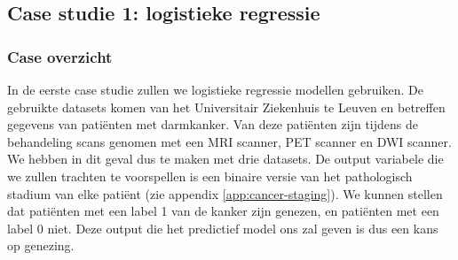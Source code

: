 \begin{abstract*}
\subsection{Case studie 1: logistieke regressie}
\subsubsection{Case overzicht}
In de eerste case studie zullen we logistieke regressie modellen gebruiken. De gebruikte datasets komen van het Universitair Ziekenhuis te Leuven en betreffen gegevens van pati\"enten met darmkanker. Van deze pati\"enten zijn tijdens de behandeling scans genomen met een MRI scanner, PET scanner en DWI scanner. We hebben in dit geval dus te maken met drie datasets. De output variabele die we zullen trachten te voorspellen is een binaire versie van het pathologisch stadium van elke pati\"ent (zie appendix \ref{app:cancer-staging}). We kunnen stellen dat pati\"enten met een label 1 van de kanker zijn genezen, en pati\"enten met een label 0 niet. Deze output die het predictief model ons zal geven is dus een kans op genezing.

\end{abstract*}
